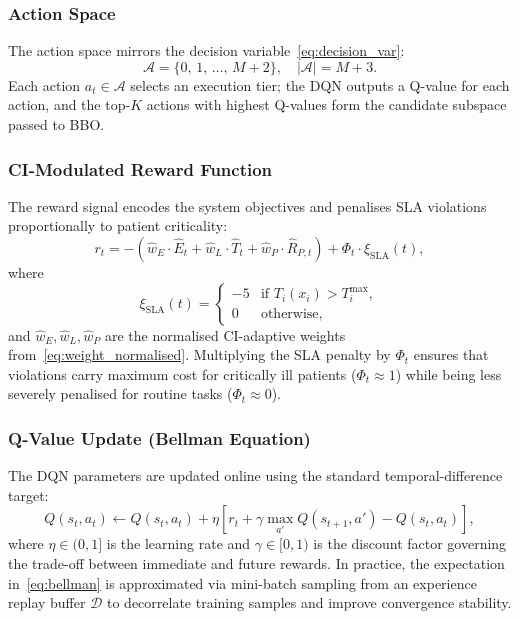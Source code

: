 \documentclass[journal,twoside,letterpaper]{IEEEtran}
\newcommand{\set}[1]{\mathcal{#1}}
\begin{document}
\subsubsection{Action Space}

The action space mirrors the decision variable~\eqref{eq:decision_var}:
\begin{equation}
  \set{A} = \{0,\, 1,\, \ldots,\, M+2\},
  \quad |\set{A}| = M + 3.
  \label{eq:dqn_actions}
\end{equation}
Each action $a_t \in \set{A}$ selects an execution tier; the DQN outputs a
Q-value for each action, and the top-$K$ actions with highest Q-values form
the candidate subspace passed to BBO.

\subsubsection{CI-Modulated Reward Function}

The reward signal encodes the system objectives and penalises SLA
violations proportionally to patient criticality:
\begin{equation}
  r_t = -\!\left(
    \hat{w}_E \cdot \hat{E}_t
    + \hat{w}_L \cdot \hat{T}_t
    + \hat{w}_P \cdot \hat{R}_{P,t}
  \right)
  + \Phi_t \cdot \xi_{\mathrm{SLA}}(t),
  \label{eq:dqn_reward}
\end{equation}
where
\begin{equation}
  \xi_{\mathrm{SLA}}(t) =
  \begin{cases}
    -5 & \text{if } T_i(x_i) > T^{\max}_i, \\
     0 & \text{otherwise,}
  \end{cases}
  \label{eq:sla_penalty}
\end{equation}
and $\hat{w}_E, \hat{w}_L, \hat{w}_P$ are the normalised CI-adaptive weights
from~\eqref{eq:weight_normalised}.  Multiplying the SLA penalty by $\Phi_t$
ensures that violations carry maximum cost for critically ill patients
($\Phi_t \approx 1$) while being less severely penalised for routine tasks
($\Phi_t \approx 0$).

\subsubsection{Q-Value Update (Bellman Equation)}

The DQN parameters are updated online using the standard temporal-difference
target:
\begin{equation}
  Q(s_t, a_t) \leftarrow Q(s_t, a_t)
    + \eta \!\left[
        r_t + \gamma \max_{a'} Q(s_{t+1}, a') - Q(s_t, a_t)
      \right],
  \label{eq:bellman}
\end{equation}
where $\eta \in (0,1]$ is the learning rate and $\gamma \in [0,1)$ is the
discount factor governing the trade-off between immediate and future rewards.
In practice, the expectation in~\eqref{eq:bellman} is approximated via
mini-batch sampling from an experience replay buffer $\set{D}$ to
decorrelate training samples and improve convergence stability.
\end{document}
